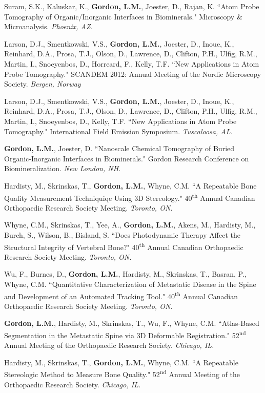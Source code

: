Suram, S.K., Kaluskar, K., \textbf{Gordon, L.M.}, Joester, D., Rajan, K. ``Atom Probe Tomography of Organic/Inorganic Interfaces in Biominerals." Microscopy \& Microanalysis. \emph{Phoenix, AZ.}

Larson, D.J., Smentkowski, V.S., \textbf{Gordon, L.M.}, Joester, D., Inoue, K.,  Reinhard, D.A., Prosa, T.J., Olson, D., Lawrence, D., Clifton, P.H., Ulfig, R.M., Martin, I., Snoeyenbos, D., Horreard, F., Kelly, T.F. ``New Applications in Atom Probe Tomography." SCANDEM 2012: Annual Meeting of the Nordic Microscopy Society. \emph{Bergen, Norway}

Larson, D.J., Smentkowski, V.S., \textbf{Gordon, L.M.}, Joester, D., Inoue, K.,  Reinhard, D.A., Prosa, T.J., Olson, D., Lawrence, D., Clifton, P.H., Ulfig, R.M., Martin, I., Snoeyenbos, D.,  Kelly, T.F. ``New Applications in Atom Probe Tomography." International Field Emission Symposium. \emph{Tuscaloosa, AL.}

\textbf{Gordon, L.M.}, Joester, D. ``Nanoscale Chemical Tomography of Buried Organic-Inorganic Interfaces in Biominerals." Gordon Research Conference on Biomineralization. \emph{New London, NH.}

Hardisty, M., Skrinskas, T., \textbf{Gordon, L.M.}, Whyne, C.M. ``A Repeatable Bone Quality Measurement Techniquiqe Using 3D Stereology." 40\textsuperscript{th} Annual Canadian Orthopaedic Research Society Meeting. \emph{Toronto, ON.}

Whyne, C.M., Skrinskas, T., Yee, A., \textbf{Gordon, L.M.}, Akens, M., Hardisty, M., Burch, S., Wilson, B., Bisland, S. ``Does Photodynamic Therapy Affect the Structural Integrity of Vertebral Bone?" 40\textsuperscript{th} Annual Canadian Orthopaedic Research Society  Meeting. \emph{Toronto, ON.}

Wu, F., Burnes, D., \textbf{Gordon, L.M.}, Hardisty, M., Skrinskas, T., Basran, P., Whyne, C.M. ``Quantitative Characterization of Metastatic Disease in the Spine and Development of an Automated Tracking Tool." 40\textsuperscript{th} Annual Canadian Orthopaedic Research Society Meeting. \emph{Toronto, ON.}

\textbf{Gordon, L.M.}, Hardisty, M., Skrinskas, T., Wu, F., Whyne, C.M. ``Atlas-Based Segmentation in the Metastatic Spine via 3D Deformable Registration." 52\textsuperscript{nd} Annual Meeting of the Orthopaedic Research Society. \emph{Chicago, IL.}

Hardisty, M., Skrinskas, T., \textbf{Gordon, L.M.}, Whyne, C.M. ``A Repeatable Stereologic Method to Measure Bone Quality." 52\textsuperscript{nd} Annual Meeting of the Orthopaedic Research Society. \emph{Chicago, IL.}

